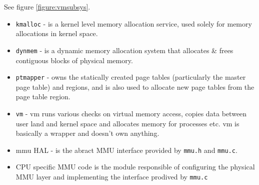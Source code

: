 See figure \ref{figure:vmsubsys}.

\begin{itemize}
  \item \verb+kmalloc+  - is a kernel level memory allocation service, used
                        solely for memory allocations in kernel space.
  \item \verb+dynmem+   - is a dynamic memory allocation system that allocates
                        \& frees contiguous blocks of physical memory.
  \item \verb+ptmapper+ - owns the statically created page tables (particularly
                        the master page table) and regions, and is also used to
                        allocate new page tables from the page table region.
  \item \verb+vm+       - vm runs various checks on virtual memory access,
                        copies data between user land and kernel space and
                        allocates memory for processes etc. vm is basically
                        a wrapper and doesn't own anything.
  \item mmu HAL -       is the abract MMU interface provided by \verb+mmu.h+
                        and \verb+mmu.c+.
  \item CPU specific MMU code is the module responsible of configuring the
        physical MMU layer and implementing the interface prodived by
        \verb+mmu.c+
\end{itemize}

